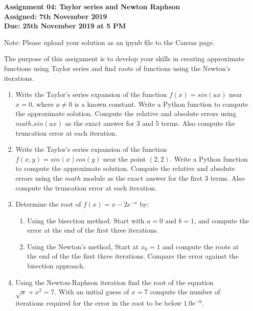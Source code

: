 \documentclass[a4paper,12pt]{article}
\begin{document}
\begin{centering}
	\textbf{
		Assignment 04: Taylor series and Newton Raphson\\
		Assigned: 7th November 2019\\
		Due: 25th November 2019 at 5 PM\\
	}
\end{centering}


Note: Please upload your solution as an ipynb file to the Canvas page.

\vspace{1em}
 
 The purpose of this assignment is to develop your skills in creating approximate functions using Taylor series and find roots of functions using the Newton's iterations.
 
\begin{enumerate}
	\item Write the Taylor's series expansion of the function $f(x)
	= sin(ax)$ 
	near $x = 0$,
	where $a \ne 0$ is a known constant. Write a Python function to compute the approximate solution. Compute the relative and absolute errors using $math.sin(ax)$ as the exact answer for 3 and 5 terms. Also compute the truncation error at each iteration.
	
	\item Write the Taylor's series expansion of the function $f(x, y)
	= sin(x)cos(y)$ 
	near the point $(2, 2)$. Write a Python function to compute the approximate solution. Compute the relative and absolute errors using the  $math$ module as the exact answer for the first 3 terms. Also compute the truncation error at each iteration.
	
	\item Determine the root of $f(x) = x - 2e^{-x}$ by:
	\begin{enumerate}
		\item Using the bisection method. Start with $a = 0$ and $b = 1$, and compute the error at the end of the first three iterations.
		\item Using the Newton's method, Start at $x_0 = 1$ and compute the roots at the end of the the first three iterations. Compare the error against the bisection approach.
	\end{enumerate}

	\item Using the Newton-Raphson iteration find the root of the equation $\sqrt{x} + x^2 = 7$. With an initial guess of $x = 7$ compute the number of iterations required for the error in the root to be below $1.0e^{-6}$.
\end{enumerate}
\end{document}
